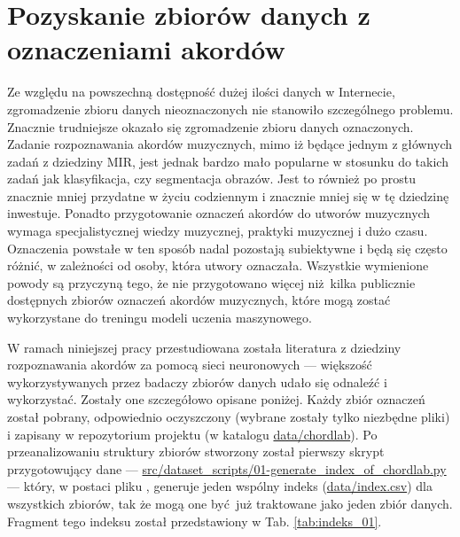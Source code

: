 \section{Pozyskanie zbiorów danych z oznaczeniami akordów}

Ze względu na powszechną dostępność dużej ilości danych w Internecie, zgromadzenie zbioru danych nieoznaczonych nie stanowiło szczególnego problemu. Znacznie trudniejsze okazało się zgromadzenie zbioru danych oznaczonych. Zadanie rozpoznawania akordów muzycznych, mimo iż będące jednym z głównych zadań z dziedziny MIR, jest jednak bardzo mało popularne w stosunku do takich zadań jak klasyfikacja, czy segmentacja obrazów. Jest to również po prostu znacznie mniej przydatne w życiu codziennym i znacznie mniej się w tę dziedzinę inwestuje. Ponadto przygotowanie oznaczeń akordów do utworów muzycznych wymaga specjalistycznej wiedzy muzycznej, praktyki muzycznej i dużo czasu. Oznaczenia powstałe w ten sposób nadal pozostają subiektywne i będą się często różnić, w zależności od osoby, która utwory oznaczała. Wszystkie wymienione powody są przyczyną tego, że nie przygotowano więcej niż kilka publicznie dostępnych zbiorów oznaczeń akordów muzycznych, które mogą zostać wykorzystane do treningu modeli uczenia maszynowego.

W ramach niniejszej pracy przestudiowana została literatura z dziedziny rozpoznawania akordów za pomocą sieci neuronowych --- większość wykorzystywanych przez badaczy zbiorów danych udało się odnaleźć i wykorzystać. Zostały one szczegółowo opisane poniżej. Każdy zbiór oznaczeń został pobrany, odpowiednio oczyszczony (wybrane zostały tylko niezbędne pliki) i zapisany w repozytorium projektu (w katalogu \url{data/chordlab}). Po przeanalizowaniu struktury zbiorów stworzony został pierwszy skrypt przygotowujący dane --- \url{src/dataset_scripts/01-generate_index_of_chordlab.py} --- który, w postaci pliku , generuje jeden wspólny indeks (\url{data/index.csv}) dla wszystkich zbiorów, tak że mogą one być już traktowane jako jeden zbiór danych. Fragment tego indeksu został przedstawiony w Tab. \ref{tab:indeks_01}.

